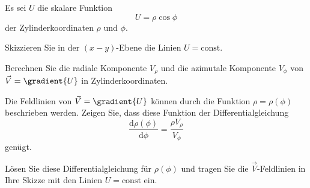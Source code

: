 \begin{atiTask}[
  title = Zylinderkoordinaten und Feldlinien
]

Es sei $U$ die skalare Funktion
\[
U=\rho\cos\phi
\]
der Zylinderkoordinaten $\rho$ und $\phi$.
\begin{atiSubtasks}
	\item Skizzieren Sie in der $(x-y)$-Ebene die Linien $U=\text{const}$.
	\item Berechnen Sie die radiale Komponente $V_\rho$ und die azimutale Komponente $V_\phi$ von $\vec{V}=\gradient{U}$ in Zylinderkoordinaten.
	\item Die Feldlinien von $\vec{V}=\gradient{U}$ können durch die Funktion $\rho=\rho(\phi)$ beschrieben werden. Zeigen Sie, dass diese Funktion der Differentialgleichung
	\[
	\frac{\mathrm{d} \rho (\phi)}{\mathrm{d} \phi}=\frac{\rho V_\rho}{V_\phi}
	\]
	genügt.
	\item Lösen Sie diese Differentialgleichung für $\rho(\phi)$ und tragen Sie die $\vec{V}$-Feldlinien in Ihre Skizze mit den Linien $U=\text{const}$ ein.
\end{atiSubtasks}

\end{atiTask}

% 	
